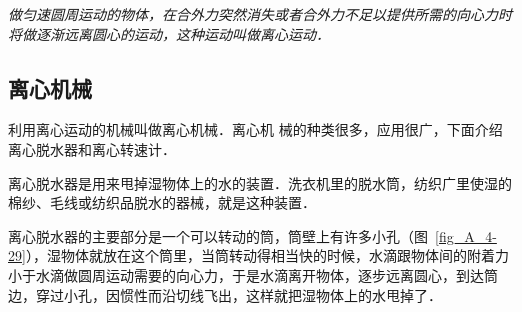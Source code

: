 \textit{做匀速圆周运动的物体，在合外力突然消失或者合外力不足以提供所需的向心力时将做逐渐远离圆心的运动，这种运动叫做离心运动．}

\subsection{离心机械}

利用离心运动的机械叫做离心机械．离心机
械的种类很多，应用很广，下面介绍离心脱水器和离心转速计．

离心脱水器是用来甩掉湿物体上的水的装置．洗衣机里的脱水筒，纺织广里使湿的棉纱、毛线或纺织品脱水的器械，就是这种装置．

离心脱水器的主要部分是一个可以转动的筒，筒壁上有许多小孔（图~\ref{fig_A_4-29}），湿物体就放在这个筒里，当筒转动得相当快的时候，水滴跟物体间的附着力小于水滴做圆周运动需要的向心力，于是水滴离开物体，逐步远离圆心，到达筒边，穿过小孔，因惯性而沿切线飞出，这样就把湿物体上的水甩掉了．

